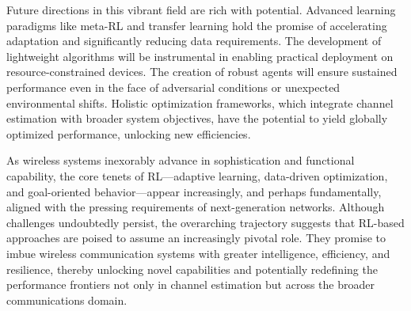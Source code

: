 \documentclass[journal,twocolumn]{IEEEtran}
\begin{document}
Future directions in this vibrant field are rich with potential. Advanced learning paradigms like meta-RL and transfer learning hold the promise of accelerating adaptation and significantly reducing data requirements. The development of lightweight algorithms will be instrumental in enabling practical deployment on resource-constrained devices. The creation of robust agents will ensure sustained performance even in the face of adversarial conditions or unexpected environmental shifts. Holistic optimization frameworks, which integrate channel estimation with broader system objectives, have the potential to yield globally optimized performance, unlocking new efficiencies.

As wireless systems inexorably advance in sophistication and functional capability, the core tenets of RL—adaptive learning, data-driven optimization, and goal-oriented behavior—appear increasingly, and perhaps fundamentally, aligned with the pressing requirements of next-generation networks. Although challenges undoubtedly persist, the overarching trajectory suggests that RL-based approaches are poised to assume an increasingly pivotal role. They promise to imbue wireless communication systems with greater intelligence, efficiency, and resilience, thereby unlocking novel capabilities and potentially redefining the performance frontiers not only in channel estimation but across the broader communications domain.
\end{document}
